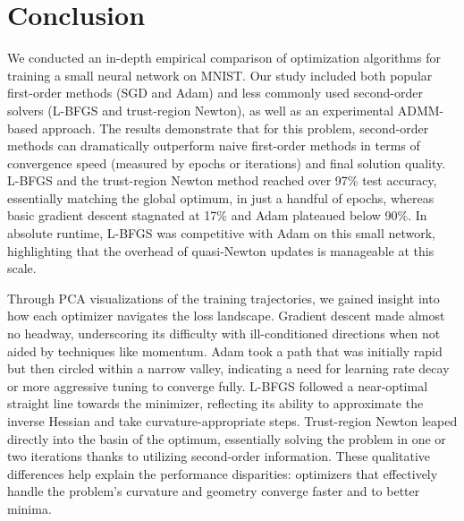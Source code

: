 \documentclass[12pt]{article}
\begin{document}
\section{Conclusion} \label{conclusion}
We conducted an in-depth empirical comparison of optimization algorithms for training a small neural network on MNIST. Our study included both popular first-order methods (SGD and Adam) and less commonly used second-order solvers (L-BFGS and trust-region Newton), as well as an experimental ADMM-based approach. The results demonstrate that for this problem, second-order methods can dramatically outperform naive first-order methods in terms of convergence speed (measured by epochs or iterations) and final solution quality. L-BFGS and the trust-region Newton method reached over 97\% test accuracy, essentially matching the global optimum, in just a handful of epochs, whereas basic gradient descent stagnated at 17\% and Adam plateaued below 90\%. In absolute runtime, L-BFGS was competitive with Adam on this small network, highlighting that the overhead of quasi-Newton updates is manageable at this scale.

Through PCA visualizations of the training trajectories, we gained insight into how each optimizer navigates the loss landscape. Gradient descent made almost no headway, underscoring its difficulty with ill-conditioned directions when not aided by techniques like momentum. Adam took a path that was initially rapid but then circled within a narrow valley, indicating a need for learning rate decay or more aggressive tuning to converge fully. L-BFGS followed a near-optimal straight line towards the minimizer, reflecting its ability to approximate the inverse Hessian and take curvature-appropriate steps. Trust-region Newton leaped directly into the basin of the optimum, essentially solving the problem in one or two iterations thanks to utilizing second-order information. These qualitative differences help explain the performance disparities: optimizers that effectively handle the problem’s curvature and geometry converge faster and to better minima.
\end{document}
